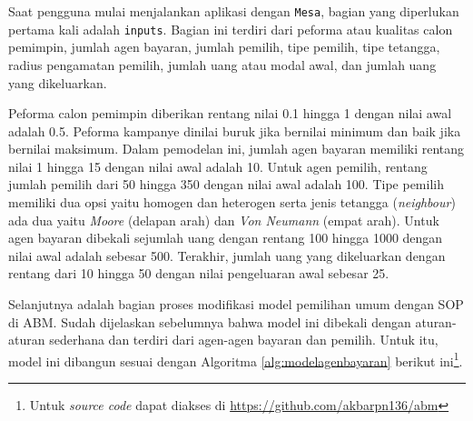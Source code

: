 Saat pengguna mulai menjalankan aplikasi dengan  \texttt{Mesa}, bagian yang diperlukan pertama kali adalah \texttt{inputs}. Bagian ini terdiri dari peforma atau kualitas calon pemimpin, jumlah agen bayaran, jumlah pemilih, tipe pemilih, tipe tetangga, radius pengamatan pemilih, jumlah uang atau modal awal, dan jumlah uang yang dikeluarkan.

Peforma calon pemimpin diberikan rentang nilai 0.1 hingga 1 dengan nilai awal adalah 0.5. Peforma kampanye dinilai buruk jika bernilai minimum dan baik jika bernilai maksimum. Dalam pemodelan ini, jumlah agen bayaran memiliki rentang nilai 1 hingga 15 dengan nilai awal adalah 10. Untuk agen pemilih, rentang jumlah pemilih dari 50 hingga 350 dengan nilai awal adalah 100. Tipe pemilih memiliki dua opsi yaitu homogen dan heterogen serta jenis tetangga (\textit{neighbour}) ada dua yaitu \textit{Moore} (delapan arah) dan \textit{Von Neumann} (empat arah). Untuk agen bayaran dibekali sejumlah uang dengan rentang 100 hingga 1000 dengan nilai awal adalah sebesar 500. Terakhir, jumlah uang yang dikeluarkan dengan rentang dari 10 hingga 50 dengan nilai pengeluaran awal sebesar 25.

Selanjutnya adalah bagian proses modifikasi model pemilihan umum dengan SOP di ABM. Sudah dijelaskan sebelumnya bahwa model ini dibekali dengan aturan-aturan sederhana dan terdiri dari agen-agen bayaran dan pemilih. Untuk itu, model ini dibangun sesuai dengan Algoritma \ref{alg:modelagenbayaran} berikut ini\footnote{Untuk \textit{source code} dapat diakses di \url{https://github.com/akbarpn136/abm}}.

